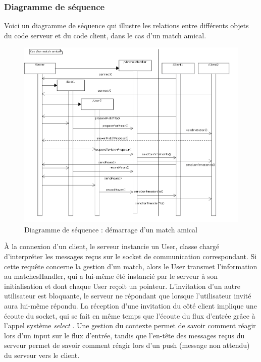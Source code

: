 \documentclass[a4paper,titlepage]{scrreprt}
\begin{document}
\subsubsection{Diagramme de séquence}
  Voici un diagramme de séquence qui illustre les relations entre différents objets du code serveur
  et du code client, dans le cas d'un match amical.
    \begin{figure}[H]
    \center
    \includegraphics[scale=0.4]{uml/Sequence_matchStarting.png}
    \caption{Diagramme de séquence : démarrage d'un match amical}
    \end{figure}
  À la connexion d'un client, le serveur instancie un User, classe chargé d'interpréter
  les messages reçus sur le socket de communication correspondant.
  Si cette requête concerne la gestion d'un match, alors le User transmet l'information
  au matchesHandler, qui a lui-même été instancié par le serveur à son initialisation et dont chaque
  User reçoit un pointeur.
  L'invitation d'un autre utilisateur est bloquante, le serveur ne répondant que
  lorsque l'utilisateur invité aura lui-même répondu. La réception d'une invitation
  du côté client implique une écoute du socket, qui se fait en même temps que l'écoute du flux
  d'entrée grâce à l'appel système \emph{select} . Une gestion du contexte
  permet de savoir comment réagir lors d'un input sur le flux d'entrée, tandis que
  l'en-tête des messages reçus du serveur permet de savoir comment réagir 
  lors d'un push (message non attendu) du serveur
  vers le client.
  
\end{document}
